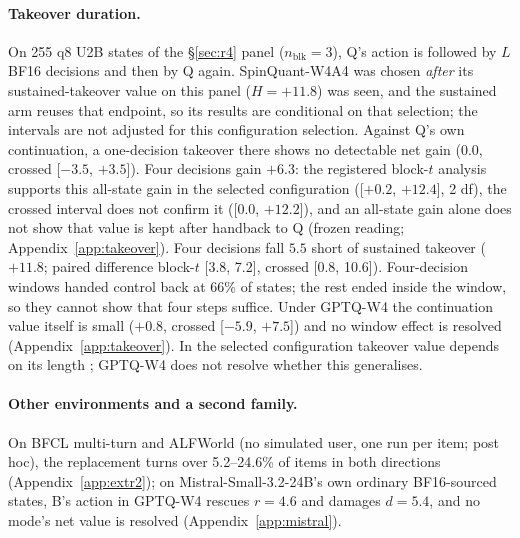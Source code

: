 \paragraph{Takeover duration.} On 255 q8 U2B states of the \S\ref{sec:r4} panel ($n_{\mathrm{blk}}=3$), Q's action is followed by $L$ BF16 decisions and then by Q again. SpinQuant-W4A4 was chosen \emph{after} its sustained-takeover value on this panel ($H=+11.8$\pp{}) was seen, and the sustained arm reuses that endpoint, so its results are conditional on that selection; the intervals are not adjusted for this configuration selection. Against Q's own continuation, a one-decision takeover there shows no detectable net gain ($0.0$, crossed [$-3.5$, $+3.5$]). Four decisions gain $+6.3$\pp{}: the registered block-$t$ analysis supports this all-state gain in the selected configuration ([$+0.2$, $+12.4$], 2 df), the crossed interval does not confirm it ([0.0, $+12.2$]), and an all-state gain alone does not show that value is kept after handback to Q (frozen reading; Appendix~\ref{app:takeover}). Four decisions fall $5.5$\pp{} short of sustained takeover ($+11.8$; paired difference block-$t$ [3.8, 7.2], crossed [0.8, 10.6]). %
Four-decision windows handed control back at 66\% of states; the rest ended inside the window, so they cannot show that four steps suffice. Under GPTQ-W4 the continuation value itself is small ($+0.8$, crossed [$-5.9$, $+7.5$]) and no window effect is resolved (Appendix~\ref{app:takeover}). In the selected configuration takeover value depends on its length \citep[cf.\ handoff costs,][]{ganz2026handoff}; GPTQ-W4 does not resolve whether this generalises. %

\paragraph{Other environments and a second family.} On BFCL multi-turn and ALFWorld (no simulated user, one run per item; post hoc), the replacement turns over 5.2--24.6\% of items in both directions (Appendix~\ref{app:extr2}); on Mistral-Small-3.2-24B's own ordinary BF16-sourced states, B's action in GPTQ-W4 rescues $r=4.6$ and damages $d=5.4$\pp{}, and no mode's net value is resolved (Appendix~\ref{app:mistral}). %
